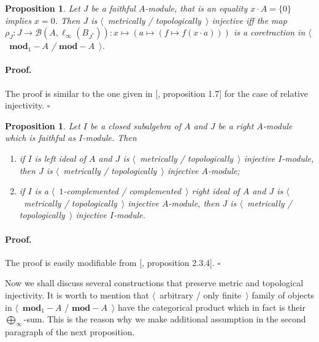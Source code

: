 \documentclass[12pt]{article}
\newtheorem{proposition}[theorem]{Proposition}
\renewenvironment{proof}{\paragraph{Proof.}}{\hfill$\square$\medskip}
\begin{document}
\begin{proposition}\label{NonDegenMetTopInjCharac}  Let $J$ be a faithful
    $A$-module, that is an equality $x\cdot A=\{0\}$ implies $x=0$. Then $J$ is
    $\langle$~metrically / topologically~$\rangle$ injective iff the map
    $\rho_J:J\to\mathcal{B}(A,\ell_\infty(B_{J^*})):x\mapsto(a\mapsto(f\mapsto
        f(x\cdot a)))$ is a coretraction in $\langle$~$\mathbf{mod}_1-A$ /
    $\mathbf{mod}-A$~$\rangle$.
\end{proposition}
\begin{proof} The proof is similar to the one given in
        [\cite{DalPolHomolPropGrAlg}, proposition 1.7] for the case of relative
    injectivity.
\end{proof}

\begin{proposition}\label{MetTopInjUnderChangeOfAlg} Let $I$ be a closed
    subalgebra of $A$ and $J$ be a right $A$-module which is faithful as
    $I$-module. Then
    \begin{enumerate}[label = (\roman*)]
        \item if $I$ is left ideal of $A$ and $J$ is $\langle$~metrically /
              topologically~$\rangle$  injective $I$-module, then $J$ is
              $\langle$~metrically / topologically~$\rangle$ injective
              $A$-module;

        \item if $I$ is a $\langle$~$1$-complemented  / complemented~$\rangle$
              right ideal of $A$ and $J$ is $\langle$~metrically /
              topologically~$\rangle$ injective $A$-module, then $J$ is
              $\langle$~metrically / topologically~$\rangle$ injective
              $I$-module.
    \end{enumerate}
\end{proposition}
\begin{proof} The proof is easily modifiable from
        [\cite{RamsHomPropSemgroupAlg}, proposition 2.3.4].
\end{proof}

Now we shall discuss several constructions that preserve metric and topological
injectivity. It is worth to mention that $\langle$~arbitrary / only
finite~$\rangle$ family of objects in $\langle$~$\mathbf{mod}_1-A$ / $\mathbf{mod}-A$~$\rangle$
have the categorical product which in fact is their $\bigoplus_\infty$-sum. This
is the reason why we make additional assumption in the second paragraph of the
next proposition.
\end{document}
